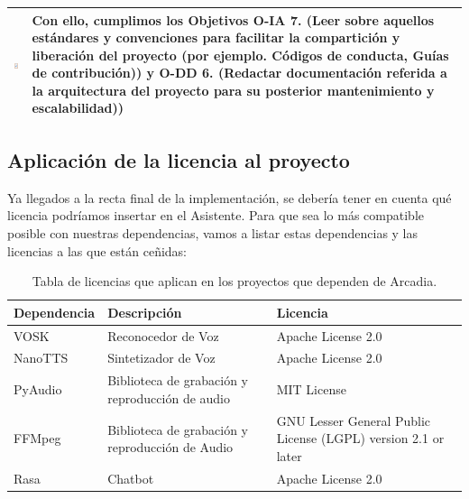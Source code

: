 \begin{table}[H]
	\centering
	\begin{tabularx}{\textwidth}{|>{\columncolor{mintgreen}}c>{\columncolor{mintgreen}}X|}
		\hline
		\includegraphics[width=30pt]{imagenes/Tarea_completada.png} & Con ello, cumplimos los Objetivos \textbf{O-IA 7.} (Leer sobre aquellos estándares y convenciones para facilitar la compartición y liberación del proyecto (por ejemplo. Códigos de conducta, Guías de contribución)) y \textbf{O-DD 6.} (Redactar documentación referida a la arquitectura del proyecto para su posterior mantenimiento y escalabilidad)) \\
		\hline
	\end{tabularx}
\end{table}

\subsection{Aplicación de la licencia al proyecto}
Ya llegados a la recta final de la implementación, se debería tener en cuenta qué licencia podríamos insertar en el Asistente. Para que sea lo más compatible posible con nuestras dependencias, vamos a listar estas dependencias y las licencias a las que están ceñidas:

\begin{center}
	\begin{table}[H]
		\centering
		\begin{tabularx}{\textwidth}{|l|X|X|}
			\hline
			{\cellcolor{lightblue}}\textbf{Dependencia} & {\cellcolor{lightblue}}\textbf{Descripción} & {\cellcolor{lightblue}}\textbf{Licencia} \\
			\hline
			VOSK & Reconocedor de Voz & Apache License 2.0 \\ \hline
			NanoTTS & Sintetizador de Voz & Apache License 2.0  \\ \hline
			PyAudio & Biblioteca de grabación y reproducción de audio & MIT License \\ \hline
			FFMpeg & Biblioteca de grabación y reproducción de Audio & GNU Lesser General Public License (LGPL) version 2.1 or later \\  \hline
			Rasa & Chatbot & Apache License 2.0 \\ \hline
		\end{tabularx}
		\caption{Tabla de licencias que aplican en los proyectos que dependen de Arcadia.}
	\end{table}
\end{center}

